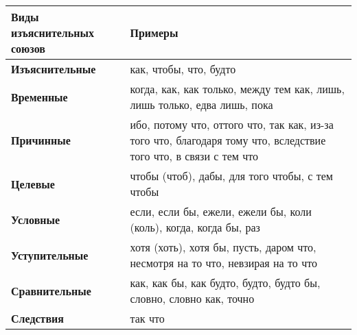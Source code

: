 \documentclass[11pt]{article} %
\begin{document}
\begin{tabular}{ | p{100pt} | p{300pt} | }
\hline
\textbf{Виды изъяснительных союзов} & \textbf{Примеры} \\ \hline
\textbf{Изъяснительные} & как, чтобы, что, будто \\ \hline
\textbf{Временные} & когда, как, как только, между тем как, лишь, лишь только, едва лишь, пока \\ \hline
\textbf{Причинные} & ибо, потому что, оттого что, так как, из-за того что, благодаря тому что, вследствие того что, в связи с тем что \\ \hline
\textbf{Целевые} & чтобы (чтоб), дабы, для того чтобы, с тем чтобы \\ \hline
\textbf{Условные} & если, если бы, ежели, ежели бы, коли (коль), когда, когда бы, раз \\ \hline
\textbf{Уступительные} & хотя (хоть), хотя бы, пусть, даром что, несмотря на то что, невзирая на то что \\ \hline
\textbf{Сравнительные} & как, как бы, как будто, будто, будто бы, словно, словно как, точно \\ \hline
\textbf{Следствия} & так что \\ \hline
\end{tabular}
\end{document}
